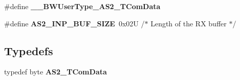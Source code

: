 \begin{DoxyCompactItemize}
\item 
\#define {\bfseries \+\_\+\+\_\+\+B\+W\+User\+Type\+\_\+\+A\+S2\+\_\+\+T\+Com\+Data}\hypertarget{group___a_s2__module_ga22728c9792ecf6c833313674b37c5553}{}\label{group___a_s2__module_ga22728c9792ecf6c833313674b37c5553}

\item 
\#define {\bfseries A\+S2\+\_\+\+I\+N\+P\+\_\+\+B\+U\+F\+\_\+\+S\+I\+ZE}~0x02\+U        /$\ast$ Length of the R\+X buffer $\ast$/\hypertarget{group___a_s2__module_ga1a01070b457eadfd09da12bb26b5472f}{}\label{group___a_s2__module_ga1a01070b457eadfd09da12bb26b5472f}

\end{DoxyCompactItemize}
\subsection*{Typedefs}
\begin{DoxyCompactItemize}
\item 
typedef byte {\bfseries A\+S2\+\_\+\+T\+Com\+Data}\hypertarget{group___a_s2__module_ga170d994b72d9b50b90572e909959cbf1}{}\label{group___a_s2__module_ga170d994b72d9b50b90572e909959cbf1}

\end{DoxyCompactItemize}

